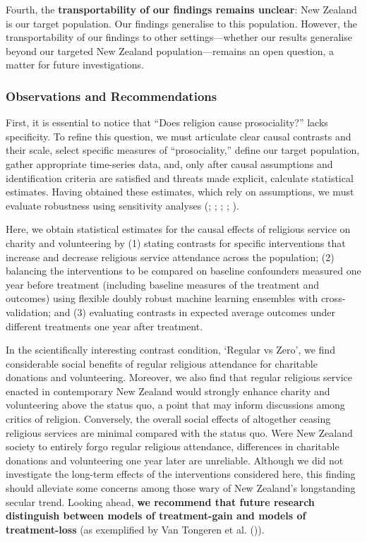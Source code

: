 \documentclass[
  single column]{article}
\begin{document}
Fourth, the \textbf{transportability of our findings remains unclear}:
New Zealand is our target population. Our findings generalise to this
population. However, the transportability of our findings to other
settings---whether our results generalise beyond our targeted New
Zealand population---remains an open question, a matter for future
investigations.

\subsubsection{Observations and
Recommendations}\label{observations-and-recommendations}

First, it is essential to notice that ``Does religion cause
prosociality?'' lacks specificity. To refine this question, we must
articulate clear causal contrasts and their scale, select specific
measures of ``prosociality,'' define our target population, gather
appropriate time-series data, and, only after causal assumptions and
identification criteria are satisfied and threats made explicit,
calculate statistical estimates. Having obtained these estimates, which
rely on assumptions, we must evaluate robustness using sensitivity
analyses (;
;
;
;
).

Here, we obtain statistical estimates for the causal effects of
religious service on charity and volunteering by (1) stating contrasts
for specific interventions that increase and decrease religious service
attendance across the population; (2) balancing the interventions to be
compared on baseline confounders measured one year before treatment
(including baseline measures of the treatment and outcomes) using
flexible doubly robust machine learning ensembles with cross-validation;
and (3) evaluating contrasts in expected average outcomes under
different treatments one year after treatment.

In the scientifically interesting contrast condition, `Regular vs Zero',
we find considerable social benefits of regular religious attendance for
charitable donations and volunteering. Moreover, we also find that
regular religious service enacted in contemporary New Zealand would
strongly enhance charity and volunteering above the status quo, a point
that may inform discussions among critics of religion. Conversely, the
overall social effects of altogether ceasing religious services are
minimal compared with the status quo. Were New Zealand society to
entirely forgo regular religious attendance, differences in charitable
donations and volunteering one year later are unreliable. Although we
did not investigate the long-term effects of the interventions
considered here, this finding should alleviate some concerns among those
wary of New Zealand's longstanding secular trend. Looking ahead,
\textbf{we recommend that future research distinguish between models of
treatment-gain and models of treatment-loss} (as exemplified by Van
Tongeren et al. ()).
\end{document}
